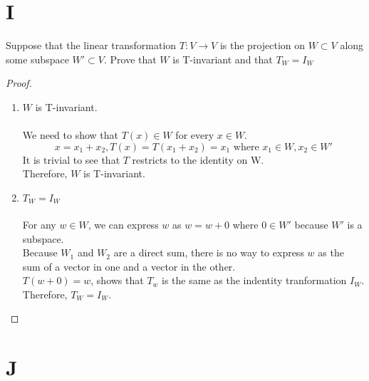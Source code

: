 \documentclass[11pt]{scrartcl}
\begin{document}
\section{I} 
Suppose that the linear transformation $T : V \rightarrow V$ is the projection on $W \subset V$ along some subspace $W' \subset V$.
Prove that $W$ is T-invariant and that $T_W = I_W$
\begin{proof}
	\-\\
\begin{enumerate}[label=\alph*.]
	\item{
		$W$ is T-invariant.\\
		\-\\
		We need to show that $T(x) \in W$ for every $x \in W$.
		$$x = x_1 + x_2, T(x) = T(x_1 + x_2) = x_1 \text{ where } x_1 \in W, x_2 \in W'$$
		It is trivial to see that $T$ restricts to the identity on W.\\
		Therefore, $W$ is T-invariant.
		}
	\item{
		$T_W = I_W$\\
		\-\\
		For any $w \in W$, we can express $w$ as $w = w + 0$ where $0 \in W'$ because $W'$ is a subspace.\\
		Because $W_1$ and $W_2$ are a direct sum, there is no way to express $w$ as the sum of a vector in one and a vector in the other.\\
		$T(w + 0) = w$, shows that $T_w$ is the same as the indentity tranformation $I_W$.\\
		Therefore, $T_W = I_W$.
		}
\end{enumerate}
\end{proof}

\section{J}
\end{document}
